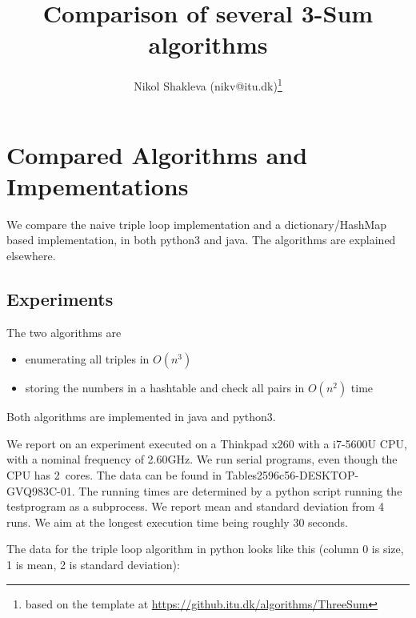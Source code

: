 \documentclass[nobib]{tufte-handout}
\title{Comparison of several 3-Sum algorithms}
\author{Nikol Shakleva (nikv@itu.dk)\thanks{based on the template at
\url{https://github.itu.dk/algorithms/ThreeSum}}}
\begin{document}
\maketitle

\section{Compared Algorithms and Impementations}

We compare the naive triple loop implementation and a dictionary/HashMap based implementation, in both python3 and java.
The algorithms are explained elsewhere.

%

\subsection{Experiments}

The two algorithms are
\begin{itemize}
\item enumerating all triples in $O(n^3)$
\item storing the numbers in a hashtable and check all pairs in $O(n^2)$ time
\end{itemize}

Both algorithms are implemented in java and python3.


\newcommand{\tableDir}{Tables2596c56-DESKTOP-GVQ983C-01}
\newcommand{\xtableDir}{Tables-APALGtraining-cce3eed}
We report on an experiment executed on a Thinkpad x260 with a i7-5600U CPU, with a  nominal frequency of 2.60GHz.
We run serial programs, even though the CPU has 2~cores.
The data can be found in \tableDir.
The running times are determined by a python script running the testprogram as a subprocess.
We report mean and standard deviation from 4 runs.
We aim at the longest execution time being roughly 30 seconds.

The data for the triple loop algorithm in python looks like this (column 0 is size, 1 is mean, 2 is standard deviation):
\end{document}
